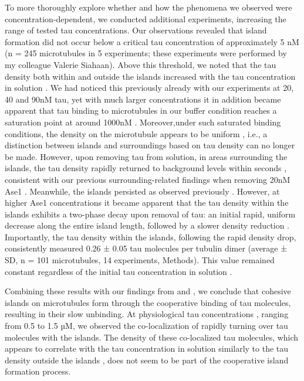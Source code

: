 To more thoroughly explore whether and how the phenomena we observed were concentration-dependent, we conducted additional experiments, increasing the range of tested tau concentrations. Our observations revealed that island formation did not occur below a critical tau concentration of approximately 5 nM (n = 245 microtubules in 5 experiments; these experiments were performed by my colleague Valerie Siahaan). Above this threshold, we noted that the tau density both within and outside the islands increased with the tau concentration in solution . We had noticed this previously already with our experiments at 20, 40 and 90nM tau, yet with much larger concentrations it in addition became apparent that tau binding to microtubules in our buffer condition reaches a saturation point at around 1000nM . Moreover,under such saturated binding conditions, the density on the microtubule appears to be uniform , i.e., a distinction between islands and surroundings based on tau density can no longer be made. However, upon removing tau from solution, in areas surrounding the islands, the tau density rapidly returned to background levels within seconds , consistent with our previous surrounding-related findings when removing 20nM Ase1 . Meanwhile, the islands persisted  as observed previously . However, at higher Ase1 concentrations it became apparent that the tau density within the islands exhibits a two-phase decay upon removal of tau: an initial rapid, uniform decrease along the entire island length, followed by a slower density reduction . Importantly, the tau density within the islands, following the rapid density drop, consistently measured 0.26 ± 0.05 tau molecules per tubulin dimer (average ± SD, n = 101 microtubules, 14 experiments, Methods). This value remained constant regardless of the initial tau concentration in solution . \par

Combining these results with our findings from  and , we conclude that cohesive islands on microtubules form through the cooperative binding of tau molecules, resulting in their slow unbinding. At physiological tau concentrations \parencite{Wegmann}, ranging from 0.5 to 1.5 µM, we observed the co-localization of rapidly turning over tau molecules with the islands. The density of these co-localized tau molecules, which appears to correlate with the tau concentration in solution similarly to the tau density outside the islands , does not seem to be part of the cooperative island formation process. \par

